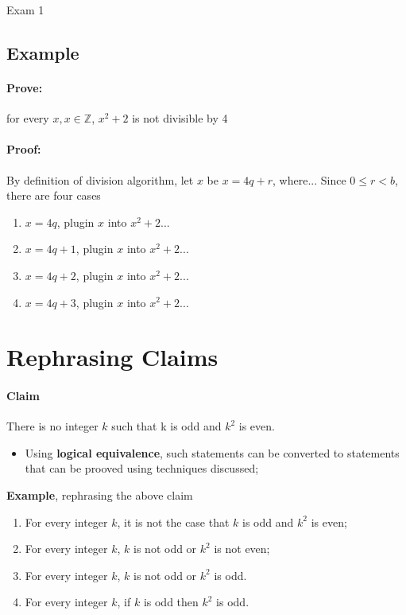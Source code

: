 \documentclass{note}
\begin{document}
\begin{note}{Exam 1}
        \subsection{Example}

        \paragraph{Prove:} for every $ x, x \in \mathbb{Z} $, $ x^{2} + 2 $ is not divisible by 4

        \paragraph{Proof:} By definition of division algorithm, let $ x $ be $ x = 4q + r $, where... 
        Since $ 0 \leq r < b $, there are four cases
        \begin{enumerate}
            \item $ x = 4q $, plugin $ x $ into $ x^{2} + 2 $...
            \item $ x = 4q + 1 $, plugin $ x $ into $ x^{2} + 2 $...
            \item $ x = 4q + 2 $, plugin $ x $ into $ x^{2} + 2 $...
            \item $ x = 4q + 3 $, plugin $ x $ into $ x^{2} + 2 $...
        \end{enumerate}

        \section{Rephrasing Claims}

        \paragraph{Claim} There is no integer $ k $ such that k is odd and $ k^{2} $ is even.
        \begin{itemize}
            \item Using \textbf{logical equivalence}, such statements can be converted to statements
            that can be prooved using techniques discussed;
        \end{itemize}

        \textbf{Example}, rephrasing the above claim

        \begin{enumerate}
            \item For every integer $ k $, it is not the case that $ k $ is odd and $ k^{2} $ is even;
            \item For every integer $ k $, $ k $ is not odd or $ k^{2} $ is not even;
            \item For every integer $ k $, $ k $ is not odd or $ k^{2} $ is odd.
            \item For every integer $ k $, if $ k $ is odd then $ k^{2} $ is odd.
        \end{enumerate}


\end{note}
\end{document}
